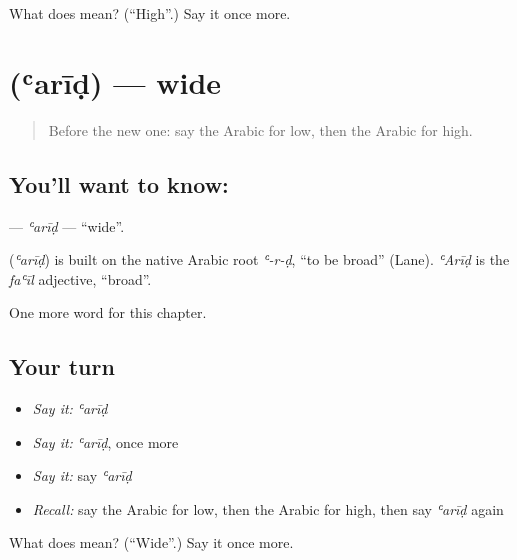 \begin{tcolorbox}[breakable,colback=teal!4,colframe=teal!35!black,title={Before you move on}]
What does  mean? (\textquotedblleft{}High\textquotedblright{}.) Say it once more.
\end{tcolorbox}
\section[\texorpdfstring{\ar{عريض} (ʿarīḍ)}{عريض (ʿarīḍ)}]{ (ʿarīḍ) — wide}

\label{lesson:AR-C150-arid}



\begin{quote}
Before the new one: say the Arabic for low, then the Arabic for high.
\end{quote}

\subsection*{You'll want to know: }
\textbf{} — \emph{ʿarīḍ} — \textquotedblleft{}wide\textquotedblright{}.

\begin{cousinweb}
\textbf{} (\emph{ʿarīḍ}) is built on the native Arabic root \emph{ʿ-r-ḍ}, \textquotedblleft{}to be broad\textquotedblright{} (Lane). \emph{ʿArīḍ} is the \emph{faʿīl} adjective, \textquotedblleft{}broad\textquotedblright{}.
\end{cousinweb}

\begin{grammarlens}[title={What you've built}]
One more word for this chapter.
\end{grammarlens}

\subsection*{Your turn}
\begin{itemize}
\raggedright
  \item \emph{Say it:} \emph{ʿarīḍ}
  \item \emph{Say it:} \emph{ʿarīḍ}, once more
  \item \emph{Say it:} say \emph{ʿarīḍ}
  \item \emph{Recall:} say the Arabic for low, then the Arabic for high, then say \emph{ʿarīḍ} again
\end{itemize}

\begin{tcolorbox}[breakable,colback=teal!4,colframe=teal!35!black,title={Before you move on}]
What does  mean? (\textquotedblleft{}Wide\textquotedblright{}.) Say it once more.
\end{tcolorbox}
